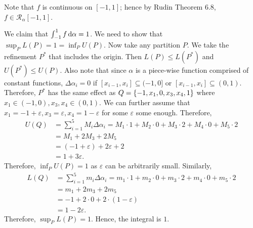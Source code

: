 \documentclass[12pt]{article}
\begin{document}
\begin{fproof}[4(d)]
   Note that \(f\) is continuous on \([-1,1]\); hence by Rudin Theorem 6.8, \(f \in \mathcal{R}_{\alpha}[-1,1]\).

   We claim that \(\int_{-1}^{1} f \mathop{}\!\mathrm{d}\alpha = 1\).
   We need to show that \(\sup_P L(P) = 1 = \inf_P U(P)\).
   Now take any partition \(P\).
   We take the refinement \(P^*\) that includes the origin. Then \(L(P) \leq L(P^*)\) and \(U(P^*) \leq U(P)\).
   Also note that since \(\alpha\) is a piece-wise function comprised of constant functions, \(\Delta \alpha_i = 0\) if \([x_{i-1}, x_i] \subseteq (-1, 0]\) or \([x_{i-1}, x_i] \subseteq (0,1)\).
   Therefore, \(P^*\) has the same effect as \(Q = \left\{ -1, x_1, 0, x_3, x_4, 1 \right\}\) where \(x_1 \in (-1,0), x_3,x_4 \in (0,1)\).
   We can further assume that \(x_1 = -1 + \varepsilon, x_3 = \varepsilon, x_4 = 1-\varepsilon\) for some \(\varepsilon\) some enough.
   Therefore,
   \begin{align*}
    U(Q) & = \sum_{i=1}^{5}M_i \Delta \alpha_i = M_1 \cdot 1 + M_2 \cdot 0 + M_3 \cdot 2 + M_4 \cdot 0 +  M_5 \cdot 2\\
    & = M_1 + 2M_3 + 2M_5\\
    & = (-1 + \varepsilon) + 2\varepsilon + 2\\
    & = 1 + 3 \varepsilon.
   \end{align*}
   Therefore, \(\inf_P U(P)= 1\) as \(\varepsilon\) can be arbitrarily small.
   Similarly,
   \begin{align*}
    L(Q) & = \sum_{i=1}^{5}m_i \Delta \alpha_i = m_1 \cdot 1 + m_2 \cdot 0 + m_3 \cdot 2 + m_4 \cdot 0 +  m_5 \cdot 2\\
    &= m_1 + 2m_3 + 2m_5\\
    &= -1 + 2 \cdot 0 + 2 \cdot (1- \varepsilon)\\
    & = 1-2 \varepsilon.
   \end{align*}
   Therefore, \(\sup_P L(P) = 1\).
   Hence, the integral is \(1\).
\end{fproof}
\newpage
\end{document}
